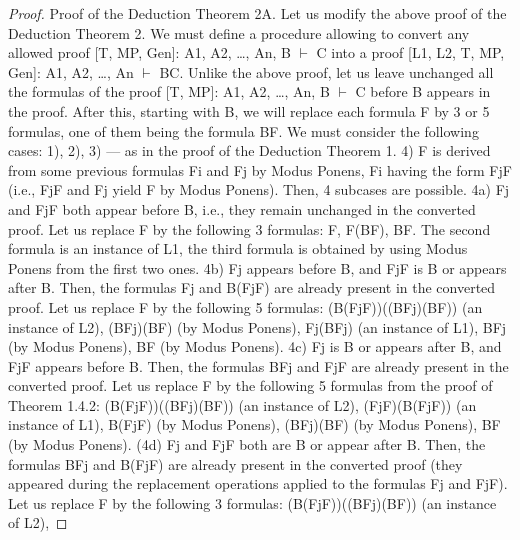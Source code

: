 \begin{proof}
Proof of the Deduction Theorem 2A. Let us modify the above proof of the Deduction Theorem 2.
We must define a procedure allowing to convert any allowed proof [T, MP, Gen]: A1, A2, \ldots , An, B \(\vdash\) C
into a proof [L1, L2, T, MP, Gen]: A1, A2, \ldots , An \(\vdash\) B\IMPLIES C.
Unlike the above proof, let us leave unchanged all the formulas of the proof [T, MP]: A1, A2, \ldots , An, B \(\vdash\)
C before B appears in the proof. After this, starting with B, we will replace each formula F by 3 or 5
formulas, one of them being the formula B\IMPLIES F.
We must consider the following cases:
1), 2), 3) --- as in the proof of the Deduction Theorem 1.
4) F is derived from some previous formulas Fi and Fj by Modus Ponens, Fi having the form Fj\IMPLIES F (i.e.,
Fj\IMPLIES F and Fj yield F by Modus Ponens). Then, 4 subcases are possible.
4a) Fj and Fj\IMPLIES F both appear before B, i.e., they remain unchanged in the converted proof. Let us replace
F by the following 3 formulas: F, F\IMPLIES (B\IMPLIES F), B\IMPLIES F. The second formula is an instance of L1, the third
formula is obtained by using Modus Ponens from the first two ones.
4b) Fj appears before B, and Fj\IMPLIES F is B or appears after B. Then, the formulas Fj and B\IMPLIES (Fj\IMPLIES F) are
already present in the converted proof. Let us replace F by the following 5 formulas:
(B\IMPLIES (Fj\IMPLIES F))\IMPLIES ((B\IMPLIES Fj)\IMPLIES (B\IMPLIES F)) (an instance of L2),
(B\IMPLIES Fj)\IMPLIES (B\IMPLIES F) (by Modus Ponens),
Fj\IMPLIES (B\IMPLIES Fj) (an instance of L1),
B\IMPLIES Fj (by Modus Ponens),
B\IMPLIES F (by Modus Ponens).
4c) Fj is B or appears after B, and Fj\IMPLIES F appears before B. Then, the formulas B\IMPLIES Fj and Fj\IMPLIES F are
already present in the converted proof. Let us replace F by the following 5 formulas from the proof of
Theorem 1.4.2:
(B\IMPLIES (Fj\IMPLIES F))\IMPLIES ((B\IMPLIES Fj)\IMPLIES (B\IMPLIES F)) (an instance of L2),
(Fj\IMPLIES F)\IMPLIES (B\IMPLIES (Fj\IMPLIES F)) (an instance of L1),
B\IMPLIES (Fj\IMPLIES F) (by Modus Ponens),
(B\IMPLIES Fj)\IMPLIES (B\IMPLIES F) (by Modus Ponens),
B\IMPLIES F (by Modus Ponens).
(4d) Fj and Fj\IMPLIES F both are B or appear after B. Then, the formulas B\IMPLIES Fj and B\IMPLIES (Fj\IMPLIES F) are already
present in the converted proof (they appeared during the replacement operations applied to the formulas
Fj and Fj\IMPLIES F). Let us replace F by the following 3 formulas:
(B\IMPLIES (Fj\IMPLIES F))\IMPLIES ((B\IMPLIES Fj)\IMPLIES (B\IMPLIES F)) (an instance of L2),

\end{proof}
